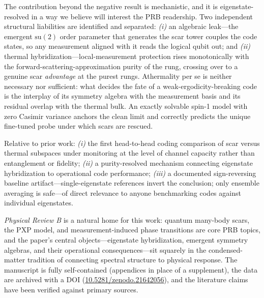\documentclass[11pt]{article}
\begin{document}
The contribution beyond the negative result is mechanistic, and it is
eigenstate-resolved in a way we believe will interest the PRB readership.
Two independent structural liabilities are identified and separated:
\emph{(i)} an algebraic leak---the emergent $\mathrm{su}(2)$ order parameter
that generates the scar tower couples the code states, so any measurement
aligned with it reads the logical qubit out; and \emph{(ii)} thermal
hybridization---local-measurement protection rises monotonically with the
forward-scattering-approximation purity of the rung, crossing over to a
genuine scar \emph{advantage} at the purest rungs. Athermality per se is
neither necessary nor sufficient: what decides the fate of a
weak-ergodicity-breaking code is the interplay of its symmetry algebra with
the measurement basis and its residual overlap with the thermal bulk. An
exactly solvable spin-1 model with zero Casimir variance anchors the clean
limit and correctly predicts the unique fine-tuned probe under which scars
are rescued.

\noindent Relative to prior work: \emph{(i)} the first head-to-head coding
comparison of scar versus thermal subspaces under monitoring at the level of
channel capacity rather than entanglement or fidelity; \emph{(ii)} a
purity-resolved mechanism connecting eigenstate hybridization to operational
code performance; \emph{(iii)} a documented sign-reversing baseline
artifact---single-eigenstate references invert the conclusion; only ensemble
averaging is safe---of direct relevance to anyone benchmarking codes against
individual eigenstates.

\vspace{0.5em}

\emph{Physical Review B} is a natural home for this work: quantum many-body
scars, the PXP model, and measurement-induced phase transitions are core PRB
topics, and the paper's central objects---eigenstate hybridization, emergent
symmetry algebras, and their operational consequences---sit squarely in the
condensed-matter tradition of connecting spectral structure to physical
response. The manuscript is fully self-contained (appendices in place of a
supplement), the data are archived with a DOI
(\href{https://doi.org/10.5281/zenodo.21642056}{10.5281/zenodo.21642056}), and
the literature claims have been verified against primary sources.

\vspace{0.5em}
\end{document}

